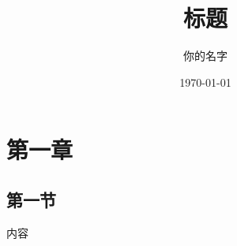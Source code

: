 \documentclass[11pt,AutoFakeBold]{article}
\title{标题}
\author{\normalsize 你的名字}
\date{\today}
\begin{document}
\maketitle
\renewcommand{\contentsname}{目录}
\tableofcontents
\section{第一章}
\label{sec:first}

\subsection{第一节}
内容
\end{document}
